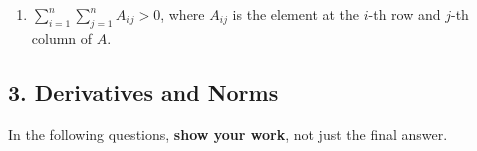 \documentclass{article}
\begin{document}
\begin{enumerate}[label=(\alph*)]
\begin{enumerate}[label=(\roman*)]
\begin{mdframed}
          \end{mdframed}
        \item $\sum_{i=1}^n \sum_{j=1}^n A_{ij} > 0$, where $A_{ij}$ is the element at the $i$-th row and $j$-th column of $A$.
    \end{enumerate}
\end{enumerate}

\newpage
\subsection*{3. Derivatives and Norms}
In the following questions, \textbf{show your work}, not just the final answer.
\end{document}
